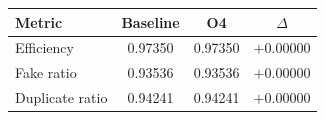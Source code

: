 \renewcommand{\arraystretch}{1.4}
\begin{tabular}{lccc}
\toprule
Metric & Baseline & O4 & $\Delta$ \\
\midrule
Efficiency & 0.97350 & 0.97350 & $+0.00000$ \\
\rowcolor{gray!15}
Fake ratio & 0.93536 & 0.93536 & $+0.00000$ \\
Duplicate ratio & 0.94241 & 0.94241 & $+0.00000$ \\
\bottomrule
\end{tabular}
